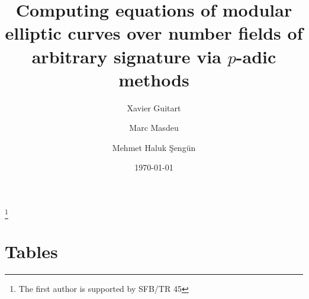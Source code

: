 \documentclass[oneside,landscape]{amsart}
\theoremstyle{definition}
\theoremstyle{remark}
\numberwithin{equation}{section}
\begin{document}
\title[Computing equations of elliptic curves via $p$-adic methods]{Computing equations of modular elliptic curves over number fields of arbitrary signature via $p$-adic methods}



\author{Xavier Guitart}
\address{Institut f\"ur Experimentelle Mathematik\\
Universit\"at Duisburg--Essen\\
Germany}
\thanks{The first author is supported by SFB/TR 45}

\author{Marc Masdeu}
\address{Mathematics Institute \\
University of Warwick \\
United Kingdom}

\author{Mehmet Haluk \c{S}eng\"un}
\address{School of Mathematics and Statistics, Hicks Building, University of Sheffield, Sheffield, S3 7RH, UK}




\date{\today}

\dedicatory{}
\maketitle 


\section{Tables}

\newpage

\newpage

\newpage

\newpage

\end{document}

